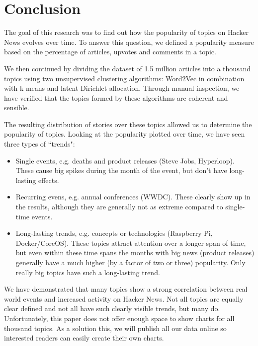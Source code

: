 \section{Conclusion}
The goal of this research was to find out how the popularity of topics on Hacker News evolves over time. To answer this question, we defined a popularity measure based on the percentage of articles, upvotes and comments in a topic.

We then continued by dividing the dataset of 1.5 million articles into a thousand topics using two unsupervised clustering algorithms: Word2Vec in combination with k-means and latent Dirichlet allocation. Through manual inspection, we have verified that the topics formed by these algorithms are coherent and sensible.

The resulting distribution of stories over these topics allowed us to determine the popularity of topics. Looking at the popularity plotted over time, we have seen three types of ``trends":
\begin{itemize}
\item Single events, e.g. deaths and product releases (Steve Jobs, Hyperloop). These cause big spikes during the month of the event, but don't have long-lasting effects.
\item Recurring evens, e.g. annual conferences (WWDC). These clearly show up in the results, although they are generally not as extreme compared to single-time events.
\item Long-lasting trends, e.g. concepts or technologies (Raspberry Pi, Docker/CoreOS). These topics attract attention over a longer span of time, but even within these time spans the months with big news (product releases) generally have a much higher (by a factor of two or three) popularity. Only really big topics have such a long-lasting trend.
\end{itemize}

We have demonstrated that many topics show a strong correlation between real world events and increased activity on Hacker News. Not all topics are equally clear defined and not all have such clearly visible trends, but many do. Unfortunately, this paper does not offer enough space to show charts for all thousand topics. As a solution this, we will publish all our data online so interested readers can easily create their own charts.
